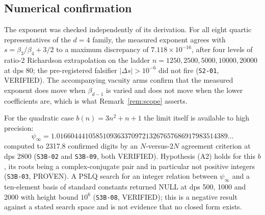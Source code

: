 \subsection{Numerical confirmation}\label{ssec:numerics-growth}

The exponent was checked independently of its derivation. For all eight quartic
representatives of the $d=4$ family, the measured exponent agrees with
$s=\beta_3/\beta_4+3/2$ to a maximum discrepancy of $7.118\times10^{-16}$, after
four levels of ratio-2 Richardson extrapolation on the ladder
$n=1250,2500,5000,10000,20000$ at dps 80; the pre-registered falsifier
$|\Delta s|>10^{-6}$ did not fire (\texttt{S2-01}, VERIFIED). The accompanying
vacuity arms confirm that the measured exponent does move when $\beta_{d-1}$ is
varied and does not move when the lower coefficients are, which is what
Remark~\ref{rem:scope} asserts.

For the quadratic case $b(n)=3n^{2}+n+1$ the limit itself is available to high
precision:
\[
  \psi_\infty=1.016604441058510936337097213267657686917983514389\ldots
\]
computed to 2317.8 confirmed digits by an $N$-versus-$2N$ agreement criterion at
dps 2800 (\texttt{S3B-02} and \texttt{S3B-09}, both VERIFIED). Hypothesis (A2)
holds for this $b$, its roots being a complex-conjugate pair and in particular
not positive integers (\texttt{S3B-03}, PROVEN). A PSLQ search for an integer
relation between $\psi_\infty$ and a ten-element basis of standard constants
returned NULL at dps 500, 1000 and 2000 with height bound $10^{6}$
(\texttt{S3B-08}, VERIFIED); this is a negative result against a stated search
space and is not evidence that no closed form exists.
